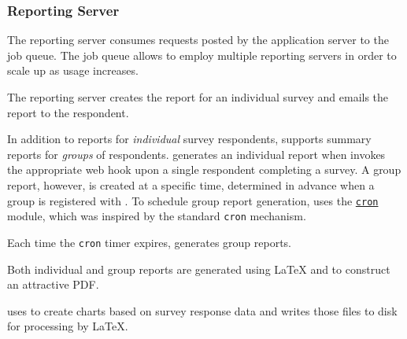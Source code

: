 \documentclass{article}
\begin{document}
\subsubsection{Reporting Server}
\label{sec:reporting-server}

The reporting server
consumes requests posted by
the application server to the \bull{} job queue.
The \bull{} job queue
allows \caper{} to employ
multiple reporting servers
in order to scale up as usage increases.


The reporting server
creates the report for an individual survey
and emails the report to the respondent.


In addition to reports for \emph{individual} survey respondents, 
\caper{} supports summary reports
for \emph{groups} of respondents.
\caper{} generates an individual report
when \qual{} invokes the appropriate web hook
upon a single respondent completing a survey.
A group report, however,
is created at a specific time,
determined in advance when a group is registered with \caper.
To schedule group report generation,
\caper{} uses the \href{https://www.npmjs.com/package/cron}{\texttt{cron}} module,
which was inspired by the standard \unix{} \texttt{cron} mechanism.

Each time the \texttt{cron} timer expires, \caper{} generates group reports.


Both individual and group reports are generated
using \LaTeX{} and \vega{} to construct an attractive PDF.

\caper{} uses \vega{} to create charts based on survey response data
and writes those files to disk for processing by \LaTeX.
\end{document}
